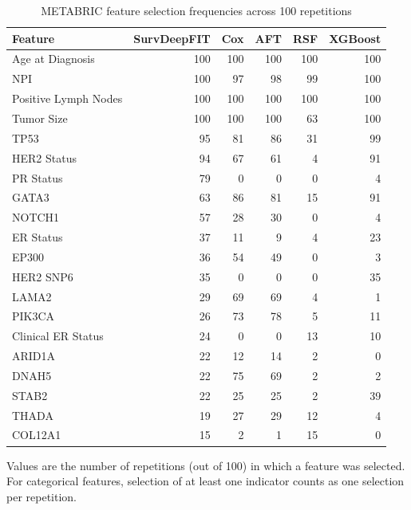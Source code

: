 \begin{table}[!htbp]
\centering
\small
\caption{METABRIC feature selection frequencies across 100 repetitions}
\label{tab:metabric_heatmap_data}
\begin{tabular}{lrrrrr}
\toprule
Feature & SurvDeepFIT & Cox & AFT & RSF & XGBoost \\
\midrule
Age at Diagnosis & 100 & 100 & 100 & 100 & 100 \\
NPI & 100 & 97 & 98 & 99 & 100 \\
Positive Lymph Nodes & 100 & 100 & 100 & 100 & 100 \\
Tumor Size & 100 & 100 & 100 & 63 & 100 \\
TP53 & 95 & 81 & 86 & 31 & 99 \\
HER2 Status & 94 & 67 & 61 & 4 & 91 \\
PR Status & 79 & 0 & 0 & 0 & 4 \\
GATA3 & 63 & 86 & 81 & 15 & 91 \\
NOTCH1 & 57 & 28 & 30 & 0 & 4 \\
ER Status & 37 & 11 & 9 & 4 & 23 \\
EP300 & 36 & 54 & 49 & 0 & 3 \\
HER2 SNP6 & 35 & 0 & 0 & 0 & 35 \\
LAMA2 & 29 & 69 & 69 & 4 & 1 \\
PIK3CA & 26 & 73 & 78 & 5 & 11 \\
Clinical ER Status & 24 & 0 & 0 & 13 & 10 \\
ARID1A & 22 & 12 & 14 & 2 & 0 \\
DNAH5 & 22 & 75 & 69 & 2 & 2 \\
STAB2 & 22 & 25 & 25 & 2 & 39 \\
THADA & 19 & 27 & 29 & 12 & 4 \\
COL12A1 & 15 & 2 & 1 & 15 & 0 \\
\bottomrule
\end{tabular}
\begin{minipage}{0.95\linewidth}
\vspace{0.5em}
\footnotesize Values are the number of repetitions (out of 100) in which a feature was selected. For categorical features, selection of at least one indicator counts as one selection per repetition.
\end{minipage}
\end{table}
